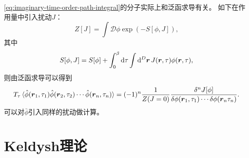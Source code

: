 \documentclass[hyperref, UTF8, a4paper]{ctexart}
\newcommand*{\fd}[1]{\mathcal{D}{#1}}
\begin{document}
\eqref{eq:imaginary-time-order-path-integral}的分子实际上和泛函求导有关。
如下在作用量中引入扰动$J$：
\begin{equation}
    Z[J] = \int \fd{\phi} \exp ( - S[\phi, J] ),
\end{equation}
其中
\begin{equation}
    S[\phi, J] = S[\phi] + \int_0^\beta \dd{\tau} \int \dd[D]{\vb*{r}} J(\vb*{r}, \tau) \phi(\vb*{r}, \tau),
\end{equation}
则由泛函求导可以得到
\begin{equation}
    T_\tau \expval*{\hat{\phi}(\vb*{r}_1, \tau_1) \hat{\phi}(\vb*{r}_2, \tau_2) \cdots \hat{\phi}(\vb*{r}_n, \tau_n)} = (-1)^n \frac{1}{Z(J=0)} \frac{\var^n J[\phi]}{\var{\phi(\vb*{r}_1, \tau_1)} \cdots \var{\phi(\vb*{r}_n \tau_n)}}.
\end{equation}
可以对$\bar{\phi}$引入同样的扰动做计算。

\section{Keldysh理论}

\end{document}
